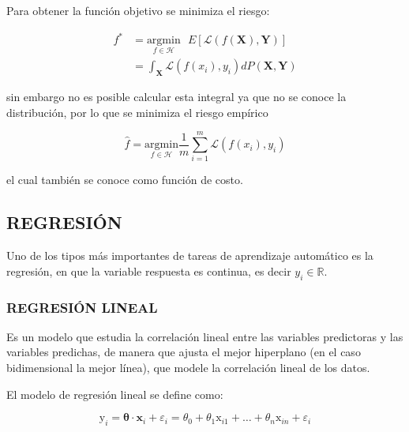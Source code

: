         Para obtener la función objetivo se minimiza el riesgo:
        
        \begin{equation}
        \begin{aligned}
            f^* &= \underset{f \in \mathcal{H}}{\text{argmin}} \text{ } E\left[\mathcal{L}(f(\mathbf{X}), \mathbf{Y})\right]\\
            &= \int_\mathbf{X} \mathcal{L}(f(x_i), y_i)dP(\mathbf{X}, \mathbf{Y})
        \end{aligned}
        \end{equation}
        
        \noindent sin embargo no es posible calcular esta integral ya que no se conoce la distribución, por lo que se minimiza el riesgo empírico
        
        \begin{equation}
            \hat{f} = \underset{f \in \mathcal{H}}{\text{argmin}} \frac{1}{m} \sum_{i=1}^m \mathcal{L}(f(x_i), y_i)
        \end{equation}
        
        \noindent el cual también se conoce como función de costo. \citep{10.5555/3360093}
        
    \subsection{REGRESIÓN}
        Uno de los tipos más importantes de tareas de aprendizaje automático es la regresión, en que la variable respuesta es continua, es decir $y_i \in \mathbb{R}$.
        \subsubsection{REGRESIÓN LINEAL}
        Es un modelo que estudia la correlación lineal entre las variables predictoras y las variables predichas, de manera que ajusta el mejor hiperplano (en el caso bidimensional la mejor línea), que modele la correlación lineal de los datos. \citep{gujarati2003basic}
        
        El modelo de regresión lineal se define como:
        
        \begin{equation}
            \mathrm{y}_i = \mathbf{\theta}\cdot\mathbf{x}_i + \varepsilon_i = \theta_0 + \theta_1\mathrm{x}_{i1} + \dots + \theta_n\mathrm{x}_{i n} + \varepsilon_i
        \end{equation}
        
